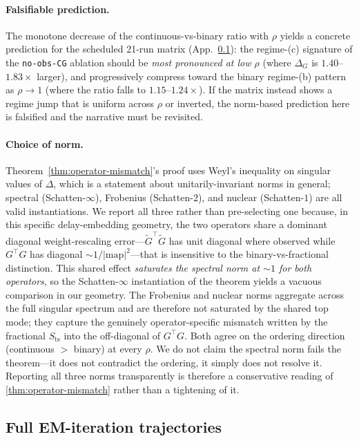 \documentclass{article}
\theoremstyle{plain}
\theoremstyle{definition}
\theoremstyle{remark}
\begin{document}
\paragraph{Falsifiable prediction.}
The monotone decrease of the continuous-vs-binary ratio with $\rho$ yields a concrete prediction for the scheduled 21-run matrix (App.~\ref{app:continuous-trajectories}): the regime-(c) signature of the \texttt{no-obs-CG} ablation should be \emph{most pronounced at low $\rho$} (where $\Delta_G$ is $1.40$--$1.83\times$ larger), and progressively compress toward the binary regime-(b) pattern as $\rho \to 1$ (where the ratio falls to $1.15$--$1.24\times$). If the matrix instead shows a regime jump that is uniform across $\rho$ or inverted, the norm-based prediction here is falsified and the narrative must be revisited.

\paragraph{Choice of norm.}
Theorem~\ref{thm:operator-mismatch}'s proof uses Weyl's inequality on singular values of $\Delta$, which is a statement about unitarily-invariant norms in general; spectral (Schatten-$\infty$), Frobenius (Schatten-$2$), and nuclear (Schatten-$1$) are all valid instantiations. We report all three rather than pre-selecting one because, in this specific delay-embedding geometry, the two operators share a dominant diagonal weight-rescaling error---$\tilde{G}^\top\tilde{G}$ has unit diagonal where observed while $G^\top G$ has diagonal $\sim 1/|\mathrm{map}|^2$---that is insensitive to the binary-vs-fractional distinction. This shared effect \emph{saturates the spectral norm at $\sim 1$ for both operators}, so the Schatten-$\infty$ instantiation of the theorem yields a vacuous comparison in our geometry. The Frobenius and nuclear norms aggregate across the full singular spectrum and are therefore not saturated by the shared top mode; they capture the genuinely operator-specific mismatch written by the fractional $S_{\mathrm{ts}}$ into the off-diagonal of $G^\top G$. Both agree on the ordering direction (continuous $>$ binary) at every $\rho$. We do not claim the spectral norm fails the theorem---it does not contradict the ordering, it simply does not resolve it. Reporting all three norms transparently is therefore a conservative reading of \cref{thm:operator-mismatch} rather than a tightening of it.

\subsection{Full EM-iteration trajectories}
\label{app:continuous-trajectories}
\end{document}
